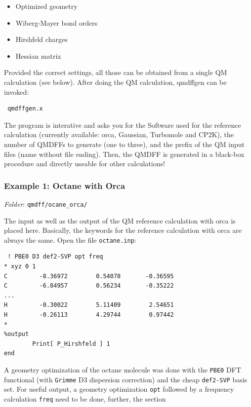 \documentclass[12pt,a4paper]{scrartcl}
\begin{document}
\begin{itemize}
 \item Optimized geometry
 \item Wiberg-Mayer bond orders
 \item Hirshfeld charges 
 \item Hessian matrix
\end{itemize}

Provided the correct settings, all those can be obtained from a single QM calculation (see below).
After doing the QM calculation, qmdffgen can be invoked:

\begin{verbatim}
 qmdffgen.x
\end{verbatim}

The program is interative and asks you for the Software used for the reference calculation
(currently available: orca, Gaussian, Turbomole and CP2K), the number of QMDFFs to generate 
(one to three), and the prefix of the QM input files (name without file ending).
Then, the QMDFF is generated in a black-box procedure and directly useable for other calculations!

 
\subsubsection{Example 1: Octane with Orca} 

\textit{Folder}: \texttt{qmdff/ocane\_orca/} \newline

The input as well as the output of the QM reference calculation with orca is placed here.
Basically, the keywords for the reference calculation with orca are always the same.
Open the file \texttt{octane.inp}:

\begin{verbatim}
 ! PBE0 D3 def2-SVP opt freq
* xyz 0 1
C         -8.36972        0.54078       -0.36595
C         -6.84957        0.56234       -0.35222
...
H         -0.30022        5.11409        2.54651
H         -0.26113        4.29744        0.97442
*
%output
        Print[ P_Hirshfeld ] 1
end
\end{verbatim}

A geometry optimization of the octane molecule was done with the \texttt{PBE0} DFT functional
(with \texttt{Grimme} D3 dispersion correction) and the cheap \texttt{def2-SVP} basis set.
For useful output, a geometry optimization \texttt{opt} followed by a frequency calculation 
\texttt{freq} need to be done, further, the section
\end{document}
